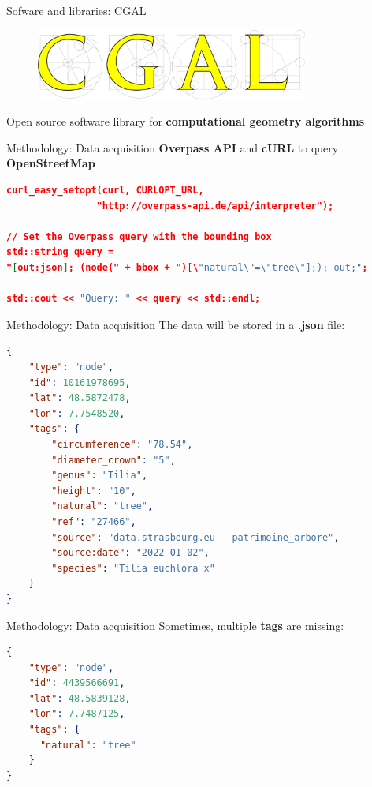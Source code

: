 \documentclass[10pt]{beamer}
\begin{document}
\begin{frame}{Sofware and libraries: CGAL}
  \Large
  \begin{figure}[H]
      \centering
      \includegraphics[width=0.8\textwidth]{images/cgal_logo.png}
  \end{figure}
  \begin{center}
    \Large Open source software library for \textbf{computational geometry algorithms}
  \end{center}
\end{frame}

\begin{frame}[fragile]{Methodology: Data acquisition}
  \textbf{Overpass API} and \textbf{cURL} to query
  \textbf{OpenStreetMap}
  \begin{lstlisting}[language=json]
curl_easy_setopt(curl, CURLOPT_URL,
                "http://overpass-api.de/api/interpreter");

// Set the Overpass query with the bounding box
std::string query =
"[out:json]; (node(" + bbox + ")[\"natural\"=\"tree\"];); out;";

std::cout << "Query: " << query << std::endl;
  \end{lstlisting}
\end{frame}


\begin{frame}[fragile]{Methodology: Data acquisition}
The data will be stored in a \textbf{.json} file:

\begin{lstlisting}[language=json]
{
    "type": "node",
    "id": 10161978695,
    "lat": 48.5872478,
    "lon": 7.7548520,
    "tags": {
        "circumference": "78.54",
        "diameter_crown": "5",
        "genus": "Tilia",
        "height": "10",
        "natural": "tree",
        "ref": "27466",
        "source": "data.strasbourg.eu - patrimoine_arbore",
        "source:date": "2022-01-02",
        "species": "Tilia euchlora x"
    }
}
\end{lstlisting}
\end{frame}

\begin{frame}[fragile]{Methodology: Data acquisition}
Sometimes, multiple \textbf{tags} are missing:

\begin{lstlisting}[language=json]
{
    "type": "node",
    "id": 4439566691,
    "lat": 48.5839128,
    "lon": 7.7487125,
    "tags": {
      "natural": "tree"
    }
}
\end{lstlisting}
\end{frame}
\end{document}
